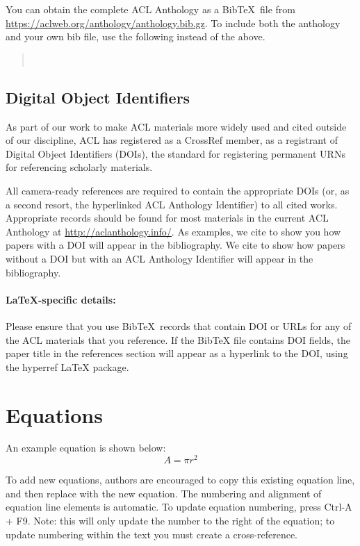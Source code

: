 \documentclass[11pt,a4paper]{article}
\begin{document}
You can obtain the complete ACL Anthology as a Bib\TeX\ file from \url{https://aclweb.org/anthology/anthology.bib.gz}.
To include both the anthology and your own bib file, use the following instead of the above.
\begin{quote}\small
\verb||\\
\verb||
\end{quote}


\subsection{Digital Object Identifiers}
As part of our work to make ACL materials more widely used and cited outside of our discipline, ACL has registered as a CrossRef member, as a registrant of Digital Object Identifiers (DOIs), the standard for registering permanent URNs for referencing scholarly materials.

All camera-ready references are required to contain the appropriate DOIs (or, as a second resort, the hyperlinked ACL Anthology Identifier) to all cited works.
Appropriate records should be found for most materials in the current ACL Anthology at \url{http://aclanthology.info/}.
As examples, we cite \citep{goodman-etal-2016-noise} to show you how papers with a DOI will appear in the bibliography.
We cite \citep{harper-2014-learning} to show how papers without a DOI but with an ACL Anthology Identifier will appear in the bibliography.

\paragraph{\LaTeX-specific details:}
Please ensure that you use Bib\TeX\ records that contain DOI or URLs for any of the ACL materials that you reference.
If the Bib\TeX{} file contains DOI fields, the paper title in the references section will appear as a hyperlink to the DOI, using the hyperref \LaTeX{} package.

\section{Equations}
An example equation is shown below:
\begin{equation}
\label{eq:example}
    A = \pi r^2
\end{equation}

To add new equations, authors are encouraged to copy this existing equation line, and then replace with the new equation. The numbering and alignment of equation line elements is automatic. To update equation numbering, press Ctrl-A + F9. Note: this will only update the number to the right of the equation; to update numbering within the text you must create a cross-reference.	
\end{document}
